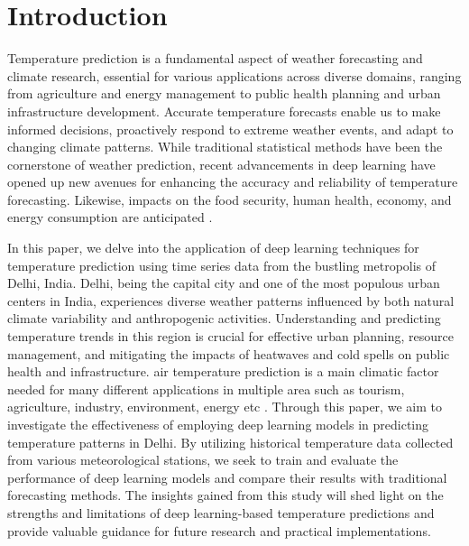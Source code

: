 \documentclass[sn-mathphys,Numbered]{sn-jnl}
\theoremstyle{thmstyleone}
\theoremstyle{thmstyletwo}
\theoremstyle{thmstylethree}
\begin{document}



\maketitle

\section{Introduction}\label{sec1}

Temperature prediction is a fundamental aspect of weather forecasting and climate research, essential for various applications across diverse domains, ranging from agriculture and energy management to public health planning and urban infrastructure development. Accurate temperature forecasts enable us to make informed decisions, proactively respond to extreme weather events, and adapt to changing climate patterns. While traditional statistical methods have been the cornerstone of weather prediction, recent advancements in deep learning have opened up new avenues for enhancing the accuracy and reliability of temperature forecasting. Likewise, impacts on the food security, human health, economy, and energy consumption are anticipated \cite{cifuentes2020air}.

In this paper, we delve into the application of deep learning techniques for temperature prediction using time series data from the bustling metropolis of Delhi, India. Delhi, being the capital city and one of the most populous urban centers in India, experiences diverse weather patterns influenced by both natural climate variability and anthropogenic activities. Understanding and predicting temperature trends in this region is crucial for effective urban planning, resource management, and mitigating the impacts of heatwaves and cold spells on public health and infrastructure. air temperature prediction is a main climatic factor needed for many different applications in multiple area such as tourism, agriculture,  industry,  environment,  energy etc \cite{abdel2004hourly}. 
Through this paper, we aim to investigate the effectiveness of employing deep learning models in predicting temperature patterns in Delhi. By utilizing historical temperature data collected from various meteorological stations, we seek to train and evaluate the performance of deep learning models and compare their results with traditional forecasting methods. The insights gained from this study will shed light on the strengths and limitations of deep learning-based temperature predictions and provide valuable guidance for future research and practical implementations.
\end{document}
